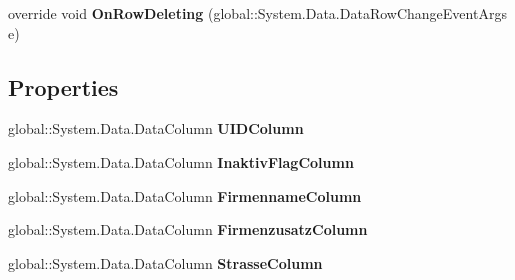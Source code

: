 \begin{DoxyCompactItemize}
\item 
override void {\bfseries On\+Row\+Deleting} (global\+::\+System.\+Data.\+Data\+Row\+Change\+Event\+Args e)\hypertarget{class_products_1_1_data_1_1ds_sage_1_1_interessent_data_table_a28d98723d48ef607fc8a61d203ee1e8f}{}\label{class_products_1_1_data_1_1ds_sage_1_1_interessent_data_table_a28d98723d48ef607fc8a61d203ee1e8f}

\end{DoxyCompactItemize}
\subsection*{Properties}
\begin{DoxyCompactItemize}
\item 
global\+::\+System.\+Data.\+Data\+Column {\bfseries U\+I\+D\+Column}\hypertarget{class_products_1_1_data_1_1ds_sage_1_1_interessent_data_table_a19e2f1ae654f1334e0eb3ed03ed55253}{}\label{class_products_1_1_data_1_1ds_sage_1_1_interessent_data_table_a19e2f1ae654f1334e0eb3ed03ed55253}

\item 
global\+::\+System.\+Data.\+Data\+Column {\bfseries Inaktiv\+Flag\+Column}\hypertarget{class_products_1_1_data_1_1ds_sage_1_1_interessent_data_table_a2c513e866522e0acbfec7cbf30dcb3c1}{}\label{class_products_1_1_data_1_1ds_sage_1_1_interessent_data_table_a2c513e866522e0acbfec7cbf30dcb3c1}

\item 
global\+::\+System.\+Data.\+Data\+Column {\bfseries Firmenname\+Column}\hypertarget{class_products_1_1_data_1_1ds_sage_1_1_interessent_data_table_aeaca539fd1ed4e7804af83f803ebfea1}{}\label{class_products_1_1_data_1_1ds_sage_1_1_interessent_data_table_aeaca539fd1ed4e7804af83f803ebfea1}

\item 
global\+::\+System.\+Data.\+Data\+Column {\bfseries Firmenzusatz\+Column}\hypertarget{class_products_1_1_data_1_1ds_sage_1_1_interessent_data_table_a2fd8d4f299850a076744f35d1123fc15}{}\label{class_products_1_1_data_1_1ds_sage_1_1_interessent_data_table_a2fd8d4f299850a076744f35d1123fc15}

\item 
global\+::\+System.\+Data.\+Data\+Column {\bfseries Strasse\+Column}\hypertarget{class_products_1_1_data_1_1ds_sage_1_1_interessent_data_table_af14ca84d9868fcbaa5345dad0cae9a9d}{}\label{class_products_1_1_data_1_1ds_sage_1_1_interessent_data_table_af14ca84d9868fcbaa5345dad0cae9a9d}


\end{DoxyCompactItemize}
